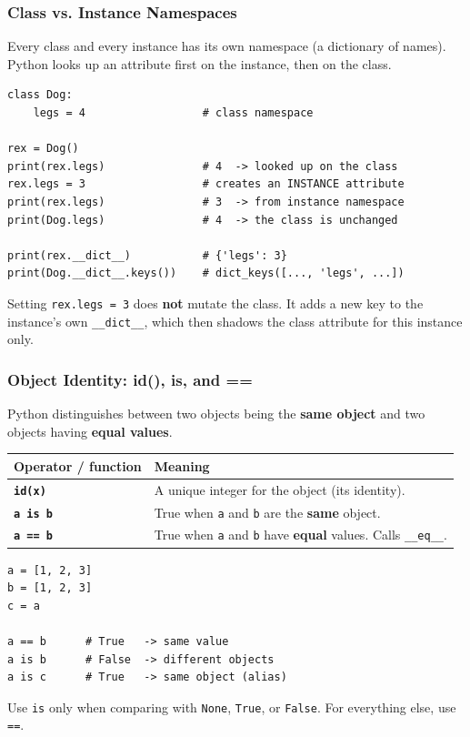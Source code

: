 \documentclass[aspectratio=169,10pt]{beamer}
\newcommand{\keyword}[1]{\textcolor{PrimaryBlue}{\textbf{#1}}}
\newcommand{\codeword}[1]{\texttt{#1}}
\newcommand{\code}[1]{\texttt{#1}}
\newenvironment{bluebox}[1]{%
  \vspace{0.08cm}\begin{tcolorbox}[lecturebox,title={#1},fontupper=\small]%
}{\end{tcolorbox}\vspace{0.05cm}}
\begin{document}
\begin{frame}[fragile]
\frametitle{Class vs. Instance Namespaces}
\small
Every class and every instance has its own namespace (a dictionary of names). Python looks up an attribute first on the instance, then on the class.

\vspace{0.12cm}
\begin{lstlisting}[style=pycode]
class Dog:
    legs = 4                  # class namespace

rex = Dog()
print(rex.legs)               # 4  -> looked up on the class
rex.legs = 3                  # creates an INSTANCE attribute
print(rex.legs)               # 3  -> from instance namespace
print(Dog.legs)               # 4  -> the class is unchanged

print(rex.__dict__)           # {'legs': 3}
print(Dog.__dict__.keys())    # dict_keys([..., 'legs', ...])
\end{lstlisting}

\begin{tcolorbox}[lecturebox,title=Mental model]
Setting \codeword{rex.legs = 3} does \keyword{not} mutate the class. It adds a new key to the instance's own \codeword{\_\_dict\_\_}, which then shadows the class attribute for this instance only.
\end{tcolorbox}
\end{frame}


\begin{frame}[fragile]
\frametitle{Object Identity: id(), is, and ==}
\small
Python distinguishes between two objects being the \keyword{same object} and two objects having \keyword{equal values}.

\vspace{0.1cm}
\renewcommand{\arraystretch}{1.25}
\begin{tabularx}{\linewidth}{>{\bfseries}p{2.0cm}X}
\toprule
Operator / function & Meaning \\
\midrule
\code{id(x)} & A unique integer for the object (its identity). \\
\code{a is b} & True when \texttt{a} and \texttt{b} are the \keyword{same} object. \\
\code{a == b} & True when \texttt{a} and \texttt{b} have \keyword{equal} values. Calls \codeword{\_\_eq\_\_}. \\
\bottomrule
\end{tabularx}

\vspace{0.18cm}
\begin{lstlisting}[style=pycode]
a = [1, 2, 3]
b = [1, 2, 3]
c = a

a == b      # True   -> same value
a is b      # False  -> different objects
a is c      # True   -> same object (alias)
\end{lstlisting}

\begin{bluebox}{Practical rule}
Use \codeword{is} only when comparing with \codeword{None}, \codeword{True}, or \codeword{False}. For everything else, use \codeword{==}.
\end{bluebox}
\end{frame}
\end{document}
